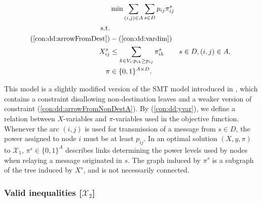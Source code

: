 \begin{subequations}[resume]\label{eq:smt-x2}
\begin{align}
\label{objective:mf} \makebox[0pt][l]{$\displaystyle{} \min \sum\limits_{(i,j) \in A} \sum\limits_{s \in D} p_{ij} \pi^s_{ij} $}\\
\notag\text{s.t.}\\
\notag(\ref{con:dd:arrowFromDest}) &- (\ref{con:dd:vardim})\\
\label{con:dd:yvar} X^s_{ij} & \leq \sum\limits_{k\in V_i:p_{ik}\geq p_{ij}}\pi^s_{ik} & s\in D, (i,j)\in A,\\
\label{con:dd:vardimy} \pi & \in \{0,1\}^{A\times D}.
\end{align}~
\end{subequations}

This model is a slightly modified version of the SMT model introduced in \cite{ivanova16isco}, which contains a constraint disallowing non-destination leaves and a weaker version of constraint (\ref{con:dd:arrowFromNonDestA}).
By (\ref{con:dd:yvar}), we define a relation between $X$-variables and $\pi$-variables used in the objective function.
Whenever the arc $(i,j)$ is used for transmission of a message from $s\in D$, the power assigned to node $i$ must be at least $p_{ij}$.
In an optimal solution $(X,y,\pi)$ to $\mathcal{X}_1$, $\pi^s\in \{0,1\}^{A}$ describes links determining the power levels used by nodes when relaying a message originated in $s$.
The graph induced by $\pi^s$ is  a subgraph of the tree induced by $X^s$, and is not necessarily connected.

\subsubsection{Valid inequalities [$\mathcal{X}_2$]}

